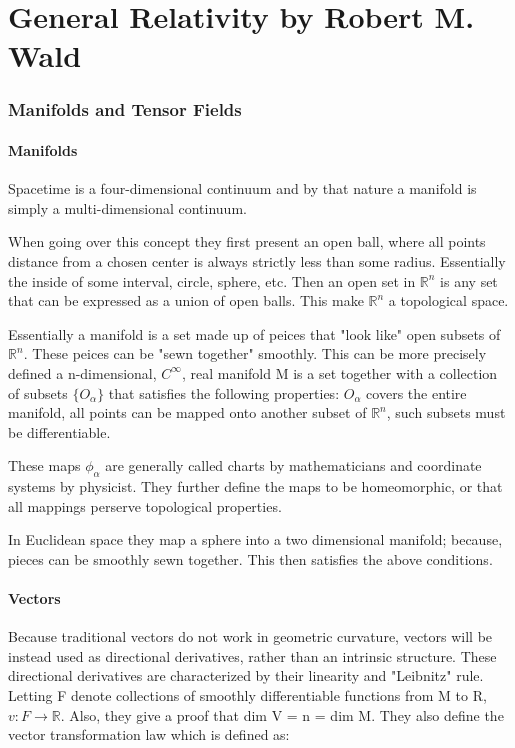 \chapter{General Relativity by Robert M. Wald}

\subsection{Manifolds and Tensor Fields}
\subsubsection{Manifolds}
Spacetime is a four-dimensional continuum and by that nature a manifold is simply a multi-dimensional continuum.

When going over this concept they first present an open ball, where  all points distance from a chosen center is always strictly less than some radius. Essentially the inside of some interval, circle, sphere, etc. Then an open set in $\mathbb{R}^n$ is any set that can be expressed as a union of open balls. This make $\mathbb{R}^n$ a topological space.

Essentially a manifold is a set made up of peices that "look like" open subsets of $\mathbb{R}^n$. These peices can be "sewn together" smoothly. This can be more precisely defined a n-dimensional, $C^{\infty}$, real manifold M is a set together with a collection of subsets $\{ O_\alpha \}$ that satisfies the following properties: $O_\alpha$ covers the entire manifold, all points can be mapped onto another subset of $\mathbb{R}^n$, such subsets must be differentiable.

These maps $\phi_\alpha$ are generally called charts by mathematicians and coordinate systems by physicist. They further define the maps to be homeomorphic, or that all mappings perserve topological properties.

In Euclidean space they map a sphere into a two dimensional manifold; because, pieces can be smoothly sewn together. This then satisfies the above conditions.

\subsubsection{Vectors}

Because traditional vectors do not work in geometric curvature, vectors will be instead used as directional derivatives, rather than an intrinsic structure. These directional derivatives are characterized by their linearity and "Leibnitz" rule. Letting F denote collections of smoothly differentiable functions from M to R, $v: F \to \mathbb{R}$. Also, they give a proof that dim V = n = dim M. They also define the vector transformation law which is defined as:

